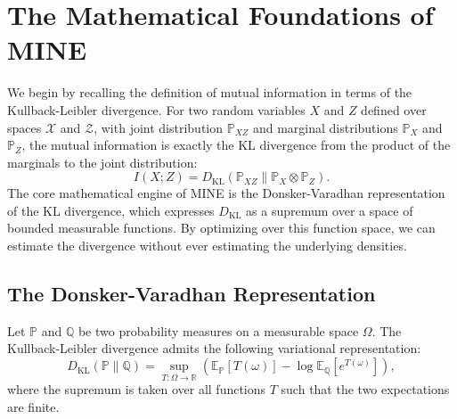 \section{The Mathematical Foundations of MINE}

We begin by recalling the definition of mutual information in terms of the Kullback-Leibler divergence. For two random variables $X$ and $Z$ defined over spaces $\mathcal{X}$ and $\mathcal{Z}$, with joint distribution $\mathbb{P}_{XZ}$ and marginal distributions $\mathbb{P}_X$ and $\mathbb{P}_Z$, the mutual information is exactly the KL divergence from the product of the marginals to the joint distribution:
\begin{equation}
    I(X; Z) = D_{\text{KL}}(\mathbb{P}_{XZ} \parallel \mathbb{P}_X \otimes \mathbb{P}_Z).
\end{equation}
The core mathematical engine of MINE is the Donsker-Varadhan representation of the KL divergence, which expresses $D_{\text{KL}}$ as a supremum over a space of bounded measurable functions. By optimizing over this function space, we can estimate the divergence without ever estimating the underlying densities.

\subsection{The Donsker-Varadhan Representation}

\begin{theorem}
\label{thm:dv}
Let $\mathbb{P}$ and $\mathbb{Q}$ be two probability measures on a measurable space $\Omega$. The Kullback-Leibler divergence admits the following variational representation:
\begin{equation}
    D_{\text{KL}}(\mathbb{P} \parallel \mathbb{Q}) = \sup_{T: \Omega \to \mathbb{R}} \left( \mathbb{E}_{\mathbb{P}}[T(\omega)] - \log \mathbb{E}_{\mathbb{Q}}[e^{T(\omega)}] \right),
\end{equation}
where the supremum is taken over all functions $T$ such that the two expectations are finite.
\end{theorem}

